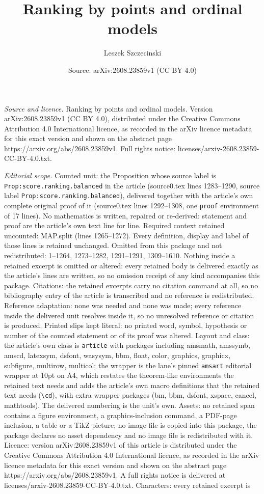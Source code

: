 \documentclass[10pt,a4paper]{amsart}
\title[Ranking by points and ordinal models]{Ranking by points and ordinal models}
\author{Leszek Szczecinski}
\date{Source: arXiv:2608.23859v1 (CC BY 4.0)}
\begin{document}
\maketitle

\noindent\emph{Source and licence.} Ranking by points and ordinal models. Version arXiv:2608.23859v1 (CC BY 4.0), distributed under the Creative Commons Attribution 4.0 International licence, as recorded in the arXiv licence metadata for this exact version and shown on the abstract page https://arxiv.org/abs/2608.23859v1. Full rights notice: licenses/arxiv-2608.23859-CC-BY-4.0.txt.\par\smallskip

\noindent\textit{Editorial scope.} Counted unit: the Proposition whose source label is \texttt{Prop:score.ranking.balanced} in the article (source0.tex lines 1283--1290, source label \texttt{Prop:score.ranking.balanced}), delivered together with the article's own complete original proof of it (source0.tex lines 1292--1308, one \texttt{proof} environment of 17 lines). No mathematics is written, repaired or re-derived: statement and proof are the article's own text line for line. Required context retained uncounted: MAP.split (lines 1265--1272). Every definition, display and label of those lines is retained unchanged. Omitted from this package and not redistributed: 1--1264, 1273--1282, 1291--1291, 1309--1610. Nothing inside a retained excerpt is omitted or altered: every retained body is delivered exactly as the article's lines are written, so no omission receipt of any kind accompanies this package. Citations: the retained excerpts carry no citation command at all, so no bibliography entry of the article is transcribed and no reference is redistributed. Reference adaptation: none was needed and none was made; every reference inside the delivered unit resolves inside it, so no unresolved reference or citation is produced. Printed slips kept literal: no printed word, symbol, hypothesis or number of the counted statement or of its proof was altered. Layout and class: the article's own class is \texttt{article} with packages including amsmath, amssymb, amscd, latexsym, dsfont, wasysym, bbm, float, color, graphics, graphicx, subfigure, multirow, multicol; the wrapper is the lane's pinned \texttt{amsart} editorial wrapper at 10pt on A4, which restates the theorem-like environments the retained text needs and adds the article's own macro definitions that the retained text needs (\texttt{\textbackslash cd}), with extra wrapper packages (bm, bbm, dsfont, xspace, cancel, mathtools). The delivered numbering is the unit's own. Assets: no retained span contains a figure environment, a graphics-inclusion command, a PDF-page inclusion, a table or a TikZ picture; no image file is copied into this package, the package declares no asset dependency and no image file is redistributed with it. Licence: version arXiv:2608.23859v1 of this article is distributed under the Creative Commons Attribution 4.0 International licence, as recorded in the arXiv licence metadata for this exact version and shown on the abstract page https://arxiv.org/abs/2608.23859v1. A full rights notice is delivered at licenses/arxiv-2608.23859-CC-BY-4.0.txt. Characters: every retained excerpt is 
\end{document}

